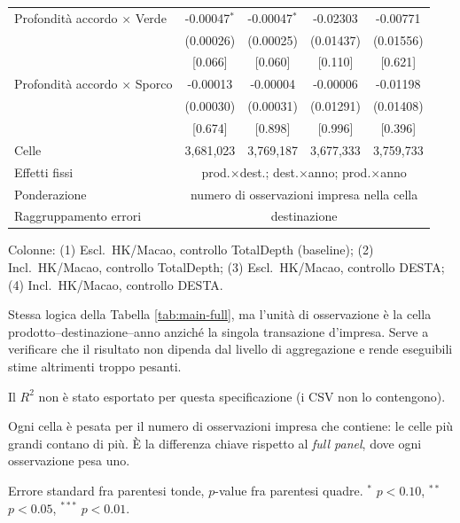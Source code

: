 \begin{table}[htbp]
\begin{threeparttable}
\begin{tabular}{lcccc}
\addlinespace
Profondit\`a accordo $\times$ Verde & -0.00047$^{*}$ & -0.00047$^{*}$ & -0.02303 & -0.00771 \\
 & (0.00026) & (0.00025) & (0.01437) & (0.01556) \\
 & [0.066] & [0.060] & [0.110] & [0.621] \\
\addlinespace
Profondit\`a accordo $\times$ Sporco & -0.00013 & -0.00004 & -0.00006 & -0.01198 \\
 & (0.00030) & (0.00031) & (0.01291) & (0.01408) \\
 & [0.674] & [0.898] & [0.996] & [0.396] \\
\addlinespace
\midrule
Celle & 3,681,023 & 3,769,187 & 3,677,333 & 3,759,733 \\
Effetti fissi & \multicolumn{4}{c}{prod.$\times$dest.; dest.$\times$anno; prod.$\times$anno} \\
Ponderazione & \multicolumn{4}{c}{numero di osservazioni impresa nella cella} \\
Raggruppamento errori & \multicolumn{4}{c}{destinazione} \\
\bottomrule
\end{tabular}
\begin{tablenotes}[flushleft]\footnotesize
\item Colonne: (1) Escl.\ HK/Macao, controllo TotalDepth (baseline); (2) Incl.\ HK/Macao, controllo TotalDepth; (3) Escl.\ HK/Macao, controllo DESTA; (4) Incl.\ HK/Macao, controllo DESTA.
\item Stessa logica della Tabella \ref{tab:main-full}, ma l'unit\`a di osservazione \`e la cella prodotto--destinazione--anno anzich\'e la singola transazione d'impresa. Serve a verificare che il risultato non dipenda dal livello di aggregazione e rende eseguibili stime altrimenti troppo pesanti.
\item Il $R^2$ non \`e stato esportato per questa specificazione (i CSV non lo contengono).
\item Ogni cella \`e pesata per il numero di osservazioni impresa che contiene: le celle pi\`u grandi contano di pi\`u. \`E la differenza chiave rispetto al \emph{full panel}, dove ogni osservazione pesa uno.
\item Errore standard fra parentesi tonde, $p$-value fra parentesi quadre. $^{*}$ $p<0.10$, $^{**}$ $p<0.05$, $^{***}$ $p<0.01$.
\end{tablenotes}
\end{threeparttable}
\end{table}
